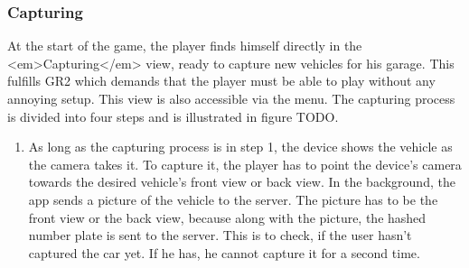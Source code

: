\subsubsection{Capturing}
At the start of the game, the player finds himself directly in the <em>Capturing</em> view, ready to capture new vehicles for his garage. This fulfills GR2 which demands that the player must be able to play without any annoying setup. This view is also accessible via the menu. The capturing process is divided into four steps and is illustrated in figure TODO.
\begin{enumerate}
  \item As long as the capturing process is in step 1, the device shows the vehicle as the camera takes it. To capture it, the player has to point the device's camera towards the desired vehicle's front view or back view. In the background, the app sends a picture of the vehicle to the server. The picture has to be the front view or the back view, because along with the picture, the hashed number plate is sent to the server. This is to check, if the user hasn't captured the car yet. If he has, he cannot capture it for a second time.


\end{enumerate}
